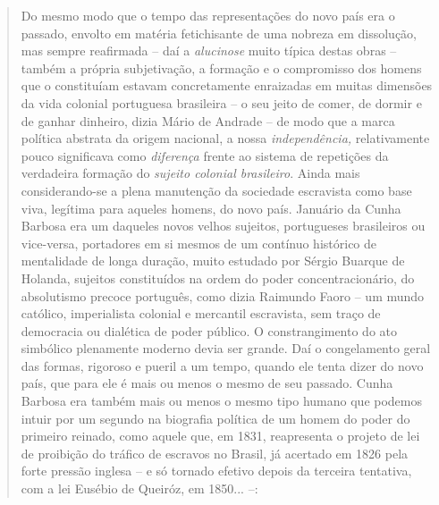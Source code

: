 \begin{quote}
Do mesmo modo que o tempo das representações do novo país era o passado,
envolto em matéria fetichisante de uma nobreza em dissolução, mas sempre
reafirmada -- daí a \emph{alucinose} muito típica destas obras -- também
a própria subjetivação, a formação e o compromisso dos homens que o
constituíam estavam concretamente enraizadas em muitas dimensões da vida
colonial portuguesa brasileira -- o seu jeito de comer, de dormir e de
ganhar dinheiro, dizia Mário de Andrade -- de modo que a marca política
abstrata da origem nacional, a nossa \emph{independência,} relativamente
pouco significava como \emph{diferença} frente ao sistema de repetições
da verdadeira formação do \emph{sujeito colonial brasileiro}. Ainda mais
considerando-se a plena manutenção da sociedade escravista como base
viva, legítima para aqueles homens, do novo país. Januário da Cunha
Barbosa era um daqueles novos velhos sujeitos, portugueses brasileiros
ou vice-versa, portadores em si mesmos de um contínuo histórico de
mentalidade de longa duração, muito estudado por Sérgio Buarque de
Holanda, sujeitos constituídos na ordem do poder concentracionário, do
absolutismo precoce português, como dizia Raimundo Faoro -- um mundo
católico, imperialista colonial e mercantil escravista, sem traço de
democracia ou dialética de poder público. O constrangimento do ato
simbólico plenamente moderno devia ser grande. Daí o congelamento geral
das formas, rigoroso e pueril a um tempo, quando ele tenta dizer do novo
país, que para ele é mais ou menos o mesmo de seu passado. Cunha Barbosa
era também mais ou menos o mesmo tipo humano que podemos intuir por um
segundo na biografia política de um homem do poder do primeiro reinado,
como aquele que, em 1831, reapresenta o projeto de lei de proibição do
tráfico de escravos no Brasil, já acertado em 1826 pela forte pressão
inglesa -- e só tornado efetivo depois da terceira tentativa, com a lei
Eusébio de Queiróz, em 1850... --:


\end{quote}
